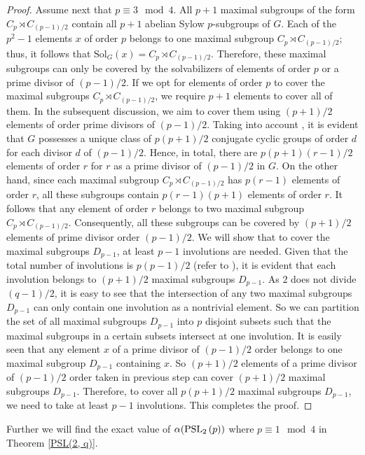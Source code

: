 \documentclass{amsart}
\newcommand{\Solv}{\text{Sol}}
\theoremstyle{definition}
\theoremstyle{remark}
\begin{document}
\begin{proof}
Assume next that $p \equiv 3 \mod 4$. All $p+1$ maximal subgroups of the form ${C_p}\rtimes C_{(p-1)/2}$ contain all $p+1$ abelian Sylow $p$-subgroups of $G$. Each of the $p^2-1$ elements $x$ of order $p$ belongs to one maximal subgroup ${C_p}\rtimes C_{(p-1)/2}$; thus, it follows that $\Solv_G(x)={C_p}\rtimes C_{(p-1)/2}$. Therefore, these maximal subgroups can only be covered by the solvabilizers of elements of order $p$ or a prime divisor of $(p-1)/2$. If we opt for elements of order $p$ to cover the maximal subgroups ${C_p}\rtimes C_{(p-1)/2}$, we require $p+1$ elements to cover all of them. In the subsequent discussion, we aim to cover them using $(p+1)/2$ elements of order prime divisors of $(p-1)/2$. Taking into account \cite[Theorem 2.1]{King}, it is evident that $G$ possesses a unique class of $p(p+1)/2$ conjugate cyclic groups of order $d$ for each divisor $d$ of $(p-1)/2$. Hence, in total, there are $p(p+1)(r-1)/2$ elements of order $r$ for $r$ as a prime divisor of $(p-1)/2$ in $G$. On the other hand, since each maximal subgroup ${C_p}\rtimes C_{(p-1)/2}$ has $p(r-1)$ elements of order $r$, all these subgroups contain $p(r-1)(p+1)$ elements of order $r$. It follows that any element of order $r$ belongs to two maximal subgroup ${C_p}\rtimes C_{(p-1)/2}$. Consequently, all these subgroups can be covered by $(p+1)/2$ elements of prime divisor order $(p-1)/2$. We will show that to cover the maximal subgroups $D_{p-1}$, at least $p-1$ involutions are needed. Given that the total number of involutions is $p(p-1)/2$ (refer to \cite[Theorem 2.1]{King}), it is evident that each involution belongs to $(p+1)/2$ maximal subgroups $D_{p-1}$. As $2$ does not divide $(q-1)/2$, it is easy to see that the intersection of any two maximal subgroups $D_{p-1}$ can only contain one involution as a nontrivial element. So we can partition the set of all maximal subgroups $D_{p-1}$ into $p$ disjoint subsets such that the maximal subgroups in a certain subsets intersect at one involution.
It is easily seen that any element $x$ of a prime divisor of $(p-1)/2$ order belongs to one maximal subgroup $D_{p-1}$ containing $x$. So $(p+1)/2$ elements of a prime divisor of $(p-1)/2$ order taken in previous step can cover $(p+1)/2$ maximal subgroups $D_{p-1}$. Therefore, to cover all $p(p+1)/2$ maximal subgroups $D_{p-1}$, we need to take at least $p-1$ involutions. This completes the proof.
\end{proof}
Further we will find the exact value of $\alpha(\operatorname{PSL}_{2}\left(p\right))$ where $p \equiv 1 \mod 4$ in Theorem \ref{PSL(2, q)}.
\end{document}
